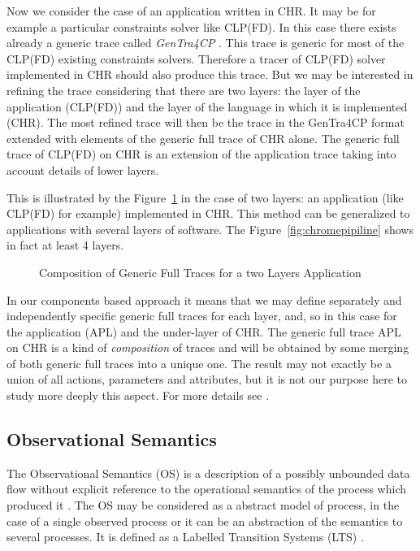 Now we consider the case of an application written in CHR. It may be for example a particular constraints solver like CLP(FD). In this case there exists already a generic trace called {\em GenTra4CP} \cite{oadimpac}. This trace is generic for most of the CLP(FD) existing constraints solvers. Therefore a tracer of CLP(FD) solver implemented in CHR should also produce this trace. But we may be interested in refining the trace considering that there are two layers: the layer of the application (CLP(FD)) and the layer of the language in which it is implemented (CHR). The most refined trace will then be the trace in the GenTra4CP format extended with elements of the generic full trace of CHR alone. The generic full trace of CLP(FD) on CHR is an extension of the application trace taking into account details of lower layers. 

This is illustrated by the Figure~\ref{fig:componentsaplchr} in the case of two layers: an application (like CLP(FD) for example) implemented in CHR. This method can be generalized to applications with several layers of software. The Figure~\ref{fig:chromepipiline} shows in fact at least 4 layers.

\begin{figure} \centering
{}
\caption[Combination of Generic Full Traces for a two Layers Application]
{Composition of Generic Full Traces for a two Layers Application}
\label{fig:componentsaplchr}
\end{figure} 

In our components based approach it means that we may define separately and independently specific generic full traces for each layer, and, so in this case for the application (APL) and the under-layer of CHR. The generic full trace APL on CHR is a kind of {\em composition} of traces and will be obtained by some merging of both generic full traces into a unique one. The result may not exactly be a union of all actions, parameters and attributes, but it is not our purpose here to study more deeply this aspect. For more details see \cite{TMTmanuscript}.






\subsection{Observational Semantics}

The Observational Semantics (OS) is a description of a possibly unbounded
data flow without explicit reference to the operational semantics of the
process which produced it \cite{deransart2007observational}. The
OS may be considered as a abstract model of process, in the
case of a single observed process or it can be an abstraction of the
semantics to several processes. It is defined as a Labelled
Transition Systems (LTS) \cite{gilmore2005trends}.





